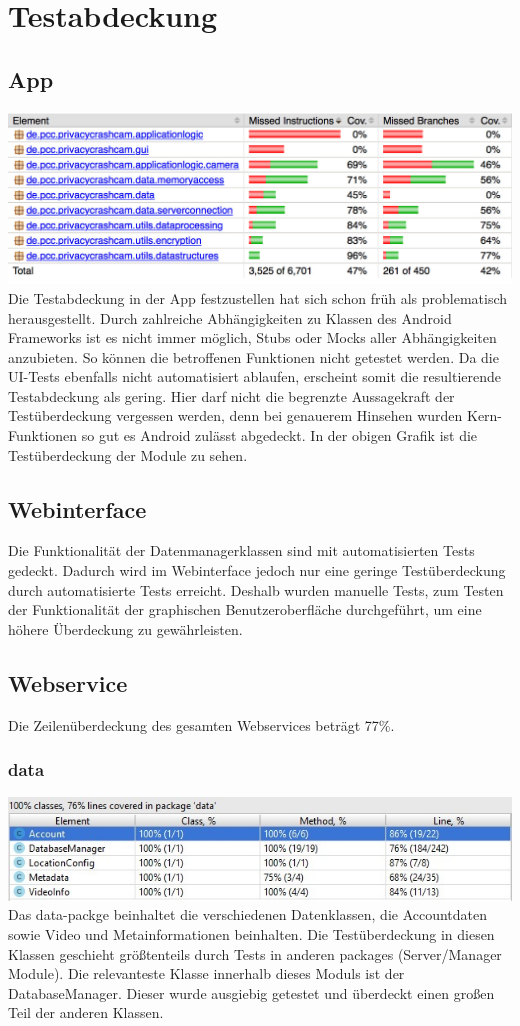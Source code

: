 \chapter{Testabdeckung}
\section{App}
\includegraphics[scale=0.6]{resources/coverage/app/Coverage.jpg}
Die Testabdeckung in der App festzustellen hat sich schon früh als problematisch herausgestellt. Durch zahlreiche Abhängigkeiten zu Klassen des Android Frameworks ist es nicht immer möglich, Stubs oder Mocks aller Abhängigkeiten anzubieten. So können die betroffenen Funktionen nicht getestet werden. Da die UI-Tests ebenfalls nicht automatisiert ablaufen, erscheint somit die resultierende Testabdeckung als gering. Hier darf nicht die begrenzte Aussagekraft der Testüberdeckung vergessen werden, denn bei genauerem Hinsehen wurden Kern-Funktionen so gut es Android zulässt abgedeckt. In der obigen Grafik ist die Testüberdeckung der Module zu sehen.

\section{Webinterface}
Die Funktionalität der Datenmanagerklassen sind mit automatisierten Tests gedeckt. Dadurch wird im Webinterface jedoch nur eine geringe Testüberdeckung durch automatisierte Tests erreicht. Deshalb wurden manuelle Tests, zum Testen der Funktionalität der graphischen Benutzeroberfläche durchgeführt, um eine höhere Überdeckung zu gewährleisten.

\section{Webservice}
Die Zeilenüberdeckung des gesamten Webservices beträgt 77\%.
\subsection{data}
\includegraphics[scale=0.8]{resources/data.jpg}
Das data-packge beinhaltet die verschiedenen Datenklassen, die Accountdaten sowie Video und Metainformationen beinhalten. Die Testüberdeckung in diesen Klassen geschieht größtenteils durch Tests in anderen packages (Server/Manager Module). Die relevanteste Klasse innerhalb dieses Moduls ist der DatabaseManager. Dieser wurde ausgiebig getestet und überdeckt einen großen Teil der anderen  Klassen.
